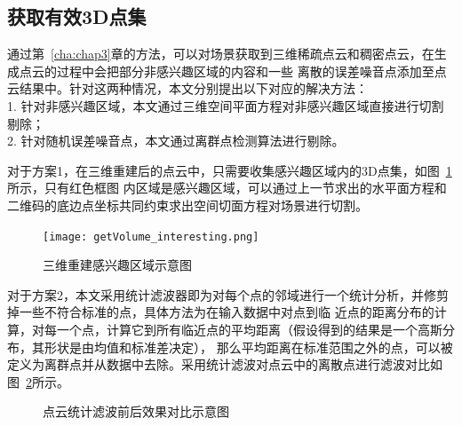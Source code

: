 \subsection{获取有效3D点集}
通过第~\ref{cha:chap3}章的方法，可以对场景获取到三维稀疏点云和稠密点云，在生成点云的过程中会把部分非感兴趣区域的内容和一些
离散的误差噪音点添加至点云结果中。针对这两种情况，本文分别提出以下对应的解决方法：\\
1.	针对非感兴趣区域，本文通过三维空间平面方程对非感兴趣区域直接进行切割剔除；\\
2.	针对随机误差噪音点，本文通过离群点检测算法进行剔除。

对于方案1，在三维重建后的点云中，只需要收集感兴趣区域内的3D点集，如图~\ref{fig:getVolume_interesting}所示，只有红色框图
内区域是感兴趣区域，可以通过上一节求出的水平面方程和二维码的底边点坐标共同约束求出空间切面方程对场景进行切割。
\begin{figure}[H] %
  \centering
  \texttt{[image: getVolume\_interesting.png]}
  \caption{三维重建感兴趣区域示意图}
  \label{fig:getVolume_interesting}
\end{figure}
对于方案2，本文采用统计滤波器即为对每个点的邻域进行一个统计分析，并修剪掉一些不符合标准的点，具体方法为在输入数据中对点到临
近点的距离分布的计算，对每一个点，计算它到所有临近点的平均距离（假设得到的结果是一个高斯分布，其形状是由均值和标准差决定），
那么平均距离在标准范围之外的点，可以被定义为离群点并从数据中去除。采用统计滤波对点云中的离散点进行滤波对比如
图~\ref{fig:getVolume_3dconstr_filter}所示。
\begin{figure}[H]
  \centering
  \vskip0.5cm
  \caption{点云统计滤波前后效果对比示意图}\label{fig:getVolume_3dconstr_filter}
\end{figure}
